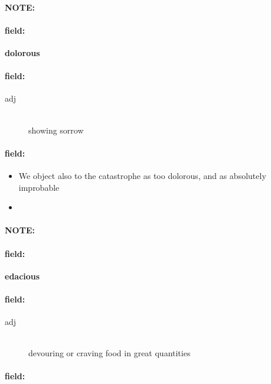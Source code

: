 \documentclass[12pt]{article}
\newenvironment{note}{\paragraph{NOTE:}}{}
\newenvironment{field}{\paragraph{field:}}{}
\begin{document}
\begin{note}
\begin{field}
\textbf{\large dolorous}
\end{field}


\begin{field}
\begin{description}
\item[adj] \hfill \\ 
showing sorrow

\end{description}
\end{field}

\begin{field}
\begin{itemize}
\item We object also to the catastrophe as too dolorous, and as absolutely improbable
\item 
\end{itemize}
\end{field}
\end{note}
\begin{note}
\begin{field}
\textbf{\large edacious}
\end{field}


\begin{field}
\begin{description}
\item[adj] \hfill \\ 
devouring or craving food in great quantities

\end{description}
\end{field}

\begin{field}
\end{field}
\end{note}
\end{document}
